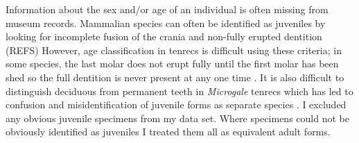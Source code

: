 Information about the sex and/or age of an individual is often missing from museum records. Mammalian species can often be identified as juveniles by looking for incomplete fusion of the crania and non-fully erupted dentition (REFS) However, age classification in tenrecs is difficult using these criteria; in some species, the last molar does not erupt fully until the first molar has been shed so the full dentition is never present at any one time \citep{Nowak1983}. It is also difficult to distinguish deciduous from permanent teeth in \textit{Microgale} tenrecs \citep{Asher2008} which has led to confusion and misidentification of juvenile forms as separate species \citep{Olson2004}. I excluded any obvious juvenile specimens from my data set. Where specimens could not be obviously identified as juveniles I treated them all as equivalent adult forms. 

